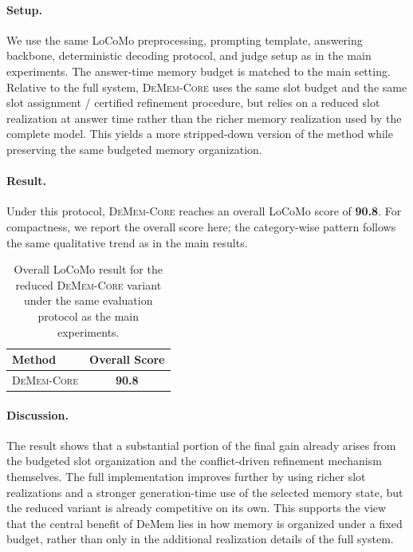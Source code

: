 \documentclass{article}
\theoremstyle{plain}
\theoremstyle{definition}
\theoremstyle{remark}
\begin{document}
\paragraph{Setup.}
We use the same LoCoMo preprocessing, prompting template, answering backbone, deterministic decoding protocol, and judge setup as in the main experiments. The answer-time memory budget is matched to the main setting. Relative to the full system, \textsc{DeMem-Core} uses the same slot budget and the same slot assignment / certified refinement procedure, but relies on a reduced slot realization at answer time rather than the richer memory realization used by the complete model. This yields a more stripped-down version of the method while preserving the same budgeted memory organization.

\paragraph{Result.}
Under this protocol, \textsc{DeMem-Core} reaches an overall LoCoMo score of \textbf{90.8}. For compactness, we report the overall score here; the category-wise pattern follows the same qualitative trend as in the main results.

\begin{table}[t]
\centering
\small
\begin{tabular}{lc}
\toprule
Method & Overall Score \\
\midrule
\textsc{DeMem-Core} & \textbf{90.8} \\
\bottomrule
\end{tabular}
\caption{Overall LoCoMo result for the reduced \textsc{DeMem-Core} variant under the same evaluation protocol as the main experiments.}
\label{tab:locomo-core}
\end{table}

\paragraph{Discussion.}
The result shows that a substantial portion of the final gain already arises from the budgeted slot organization and the conflict-driven refinement mechanism themselves. The full implementation improves further by using richer slot realizations and a stronger generation-time use of the selected memory state, but the reduced variant is already competitive on its own. This supports the view that the central benefit of DeMem lies in how memory is organized under a fixed budget, rather than only in the additional realization details of the full system.
\end{document}
